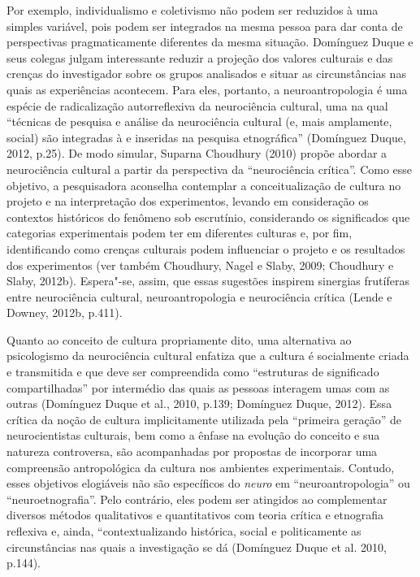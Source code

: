 Por exemplo, individualismo e coletivismo não podem ser reduzidos à uma
simples variável, pois podem ser integrados na mesma pessoa para dar
conta de perspectivas pragmaticamente diferentes da mesma situação.
Domínguez Duque e seus colegas julgam interessante reduzir a projeção
dos valores culturais e das crenças do investigador sobre os grupos
analisados e situar as circunstâncias nas quais as experiências
acontecem. Para eles, portanto, a neuroantropologia é uma espécie de
radicalização autorreflexiva da neurociência cultural, uma na qual
``técnicas de pesquisa e análise da neurociência cultural (e, mais
amplamente, social) são integradas à e inseridas na pesquisa
etnográfica'' (Domínguez Duque, 2012, p.25). De modo simular, Suparna
Choudhury (2010) propõe abordar a neurociência cultural a partir da
perspectiva da ``neurociência crítica''. Como esse objetivo, a
pesquisadora aconselha contemplar a conceitualização de cultura no
projeto e na interpretação dos experimentos, levando em consideração os
contextos históricos do fenômeno sob escrutínio, considerando os
significados que categorias experimentais podem ter em diferentes
culturas e, por fim, identificando como crenças culturais podem
influenciar o projeto e os resultados dos experimentos (ver também
Choudhury, Nagel e Slaby, 2009; Choudhury e Slaby, 2012b). Espera"-se,
assim, que essas sugestões inspirem sinergias frutíferas entre
neurociência cultural, neuroantropologia e neurociência crítica (Lende e
Downey, 2012b, p.411).

Quanto ao conceito de cultura propriamente dito, uma alternativa ao
psicologismo da neurociência cultural enfatiza que a cultura é
socialmente criada e transmitida e que deve ser compreendida como
``estruturas de significado compartilhadas'' por intermédio das quais as
pessoas interagem umas com as outras (Domínguez Duque et al., 2010,
p.139; Domínguez Duque, 2012). Essa crítica da noção de cultura
implicitamente utilizada pela ``primeira geração'' de neurocientistas
culturais, bem como a ênfase na evolução do conceito e sua natureza
controversa, são acompanhadas por propostas de incorporar uma
compreensão antropológica da cultura nos ambientes experimentais.
Contudo, esses objetivos elogiáveis não são específicos do \emph{neuro}
em ``neuroantropologia'' ou ``neuroetnografia''. Pelo contrário, eles
podem ser atingidos ao complementar diversos métodos qualitativos e
quantitativos com teoria crítica e etnografia reflexiva e, ainda,
``contextualizando histórica, social e politicamente as circunstâncias
nas quais a investigação se dá (Domínguez Duque et al. 2010, p.144).


